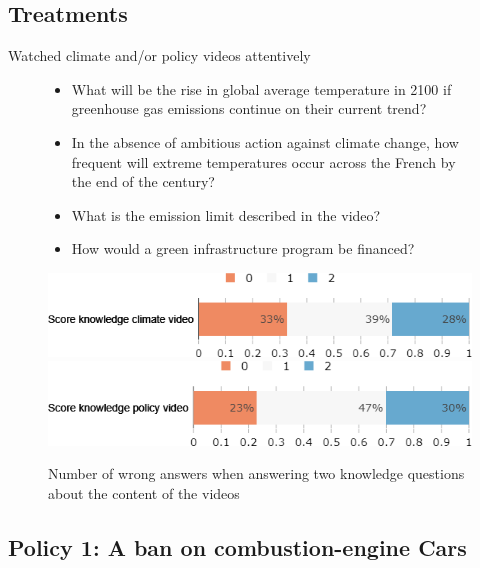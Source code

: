 \begin{framefont}{\small}
\subsection{Treatments}

\begin{frame}{Watched climate and/or policy videos attentively}%
\begin{figure}[h!]
\centering
\caption{Number of wrong answers when answering two knowledge questions about the content of the videos}
\footnotesize \begin{itemize}
\item What will be the rise in global average temperature in 2100 if greenhouse gas emissions continue on their current trend?
\item In the absence of ambitious action against climate change, how frequent will extreme temperatures occur across the French by the end of the century?
\item What is the emission limit described in the video? 
\item How would a green infrastructure program be financed?
\end{itemize}

\includegraphics[width=.61\paperwidth]{../figures/FR/know_treatment_climate_FR.png} \\
\includegraphics[width=.61\paperwidth]{../figures/FR/know_treatment_policy_FR.png}
\end{figure}
\end{frame}



\subsection{Policy 1: A ban on combustion-engine Cars}


\end{framefont}
